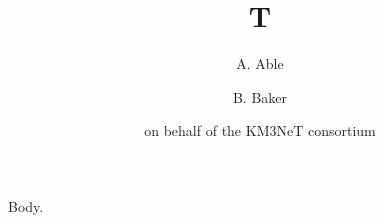 \documentclass{elsarticle}
\begin{document}
\begin{frontmatter}
\title{T}
\author{A. Able}
\author{B. Baker}
\author{on behalf of the KM3NeT consortium}
\address{Univ A, Town A}
\end{frontmatter}
Body.
\end{document}

